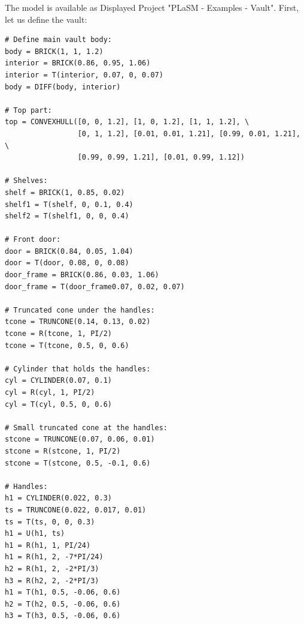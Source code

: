 The model is available as Displayed Project "PLaSM - Examples - Vault". First, let us 
define the vault:\\

{\small
\begin{bbox}
\begin{verbatim}
# Define main vault body:
body = BRICK(1, 1, 1.2)
interior = BRICK(0.86, 0.95, 1.06)
interior = T(interior, 0.07, 0, 0.07)
body = DIFF(body, interior)

# Top part:
top = CONVEXHULL([0, 0, 1.2], [1, 0, 1.2], [1, 1, 1.2], \
                 [0, 1, 1.2], [0.01, 0.01, 1.21], [0.99, 0.01, 1.21], \
                 [0.99, 0.99, 1.21], [0.01, 0.99, 1.12])

# Shelves:
shelf = BRICK(1, 0.85, 0.02)
shelf1 = T(shelf, 0, 0.1, 0.4)
shelf2 = T(shelf1, 0, 0, 0.4)

# Front door:
door = BRICK(0.84, 0.05, 1.04)
door = T(door, 0.08, 0, 0.08)
door_frame = BRICK(0.86, 0.03, 1.06)
door_frame = T(door_frame0.07, 0.02, 0.07)

# Truncated cone under the handles:
tcone = TRUNCONE(0.14, 0.13, 0.02)
tcone = R(tcone, 1, PI/2)
tcone = T(tcone, 0.5, 0, 0.6)

# Cylinder that holds the handles:
cyl = CYLINDER(0.07, 0.1)
cyl = R(cyl, 1, PI/2)
cyl = T(cyl, 0.5, 0, 0.6)

# Small truncated cone at the handles:
stcone = TRUNCONE(0.07, 0.06, 0.01)
stcone = R(stcone, 1, PI/2)
stcone = T(stcone, 0.5, -0.1, 0.6)

# Handles:
h1 = CYLINDER(0.022, 0.3)
ts = TRUNCONE(0.022, 0.017, 0.01)
ts = T(ts, 0, 0, 0.3)
h1 = U(h1, ts)
h1 = R(h1, 1, PI/24)
h1 = R(h1, 2, -7*PI/24)
h2 = R(h1, 2, -2*PI/3)
h3 = R(h2, 2, -2*PI/3)
h1 = T(h1, 0.5, -0.06, 0.6)
h2 = T(h2, 0.5, -0.06, 0.6)
h3 = T(h3, 0.5, -0.06, 0.6)
\end{verbatim}
\end{bbox}
}

